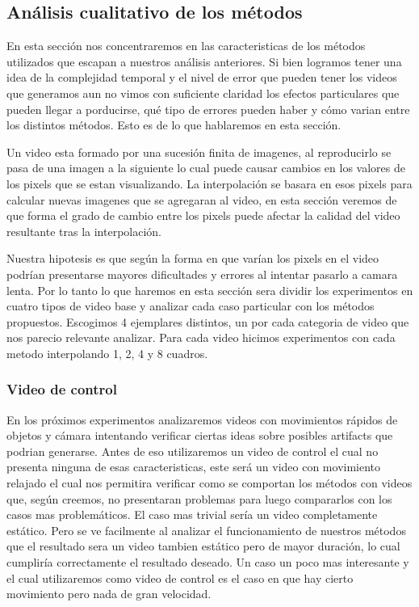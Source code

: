 \subsection{Análisis cualitativo de los métodos}

En esta sección nos concentraremos en las caracteristicas de los métodos utilizados que escapan a nuestros análisis anteriores. Si bien logramos tener una idea de la complejidad temporal y el nivel de error que pueden tener los videos que generamos aun no vimos con suficiente claridad los efectos particulares que pueden llegar a porducirse, qué tipo de errores pueden haber y cómo varian entre los distintos métodos. Esto es de lo que hablaremos en esta sección.

Un video esta formado por una sucesión finita de imagenes, al reproducirlo se pasa de una imagen a la siguiente lo cual puede causar cambios en los valores de los pixels que se estan visualizando. La interpolación se basara en esos pixels para calcular nuevas imagenes que se agregaran al video, en esta sección veremos de que forma el grado de cambio entre los pixels puede afectar la calidad del video resultante tras la interpolación.

Nuestra hipotesis es que según la forma en que varían los pixels en el video podrían presentarse mayores dificultades y errores al intentar pasarlo a camara lenta. Por lo tanto lo que haremos en esta sección sera dividir los experimentos en cuatro tipos de video base y analizar cada caso particular con los métodos propuestos. Escogimos 4 ejemplares distintos, un por cada categoria de video que nos parecio relevante analizar. Para cada video hicimos experimentos con cada metodo interpolando 1, 2, 4 y 8 cuadros.


\subsubsection{Video de control}

En los próximos experimentos analizaremos videos con movimientos rápidos de objetos y cámara intentando verificar ciertas ideas sobre posibles artifacts que podrian generarse. Antes de eso utilizaremos un video de control el cual no presenta ninguna de esas caracteristicas, este será un video con movimiento relajado el cual nos permitira verificar como se comportan los métodos con videos que, según creemos, no presentaran problemas para luego compararlos con los casos mas problemáticos. El caso mas trivial sería un video completamente estático. Pero se ve facilmente al analizar el funcionamiento de nuestros métodos que el resultado sera un video tambien estático pero de mayor duración, lo cual cumpliría correctamente el resultado deseado. Un caso un poco mas interesante y el cual utilizaremos como video de control es el caso en que hay cierto movimiento pero nada de gran velocidad.

